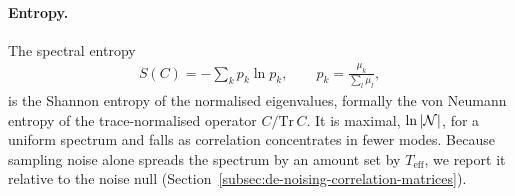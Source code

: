 \paragraph{Entropy.}
The spectral entropy
\begin{align}
    S(C) = -\sum\limits_{k} p_{k} \ln p_{k}, \qquad p_{k} = \frac{\mu_{k}}{\sum_{l} \mu_{l}},
    \label{eqn:vnentropy}
\end{align}
is the Shannon entropy of the normalised eigenvalues, formally the von Neumann entropy of the trace-normalised operator $C/\mathrm{Tr}\,C$.
It is maximal, $\ln |\mathcal{N}|$, for a uniform spectrum and falls as correlation concentrates in fewer modes.
Because sampling noise alone spreads the spectrum by an amount set by $T_{\text{eff}}$, we report it relative to the noise null (Section~\ref{subsec:de-noising-correlation-matrices}).
